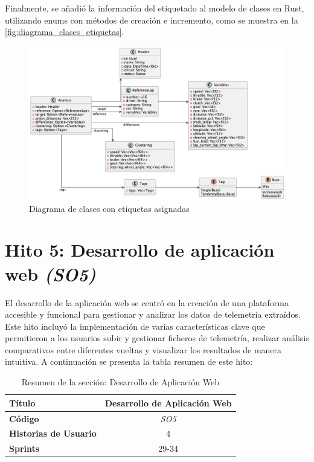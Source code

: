 Finalmente, se añadió la información del etiquetado al modelo de clases en Rust, utilizando enums con métodos de creación e incremento, como se muestra en la \autoref{fig:diagrama_clases_etiquetas}.

\begin{figure}[H]
	\centering
	\includegraphics[width=1\linewidth]{./figs/herramientas/desarrollo/diagrama_clases_etiquetas.png}
	\caption[Diagrama de clases con etiquetas asignadas]{Diagrama de clases con etiquetas asignadas}
    \label{fig:diagrama_clases_etiquetas}
\end{figure}


\newpage

\section{Hito 5: Desarrollo de aplicación web \textit{(SO5)}}

El desarrollo de la aplicación web se centró en la creación de una plataforma accesible y funcional para gestionar y analizar los datos de telemetría extraídos. Este hito incluyó la implementación de varias características clave que permitieron a los usuarios subir y gestionar ficheros de telemetría, realizar análisis comparativos entre diferentes vueltas y visualizar los resultados de manera intuitiva. A continuación se presenta la tabla resumen de este hito:

\begin{table}[H]
\centering
\begin{tabular}{|l|c|}
\hline
\textbf{Título} & Desarrollo de Aplicación Web \\ \hline
\textbf{Código} & \textit{SO5} \\ \hline
\textbf{Historias de Usuario} & 4 \\ \hline
\textbf{Sprints} & 29-34 \\ \hline
\end{tabular}
\caption{Resumen de la sección: Desarrollo de Aplicación Web}
\label{tab:desarrollo_aplicacion_web}
\end{table}

